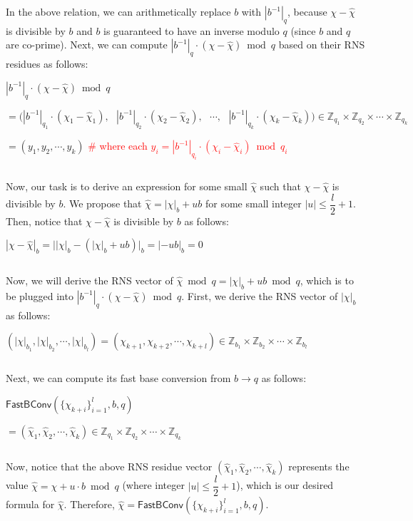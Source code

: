 $ $

In the above relation, we can arithmetically replace $b$ with $|b^{-1}|_q$, because $\chi - \hat{\chi}$ is divisible by $b$ and $b$ is guaranteed to have an inverse modulo $q$ (since $b$ and $q$ are co-prime). Next, we can compute  $|b^{-1}|_{q}\cdot (\chi - \hat{\chi}) \bmod q$ based on their RNS residues as follows:

$|b^{-1}|_q\cdot (\chi - \hat{\chi}) \bmod q$

$= \bm(|b^{-1}|_{q_1} \cdot (\chi_1 - \hat\chi_1), \text{ } |b^{-1}|_{q_2} \cdot (\chi_2 - \hat\chi_2), \text{ } \cdots, \text{ } |b^{-1}|_{q_k} \cdot (\chi_k - \hat\chi_k)\bm) \in \mathbb{Z}_{q_1} \times \mathbb{Z}_{q_2} \times \cdots \times \mathbb{Z}_{q_k} $

$= (y_1, y_2, \cdots, y_k) $ \textcolor{red}{ \# where each $y_i = |b^{-1}|_{q_i} \cdot (\chi_i - \hat\chi_i) \bmod q_i$}

$ $

Now, our task is to derive an expression for some small $\hat\chi$ such that $\chi - \hat\chi$ is divisible by $b$. We propose that $\hat\chi = |\chi|_b + ub$ for some small integer $|u| \leq \dfrac{l}{2}+1$. Then, notice that $\chi - \hat\chi$ is divisible by $b$ as follows:

$|\chi - \hat\chi|_b = \Big||\chi|_b - (|\chi|_b + ub)\Big|_b = |-ub|_b = 0$


$ $

Now, we will derive the RNS vector of $\hat\chi \bmod q = |\chi|_b + ub \bmod q$, which is to be plugged into $|b^{-1}|_q\cdot (\chi - \hat{\chi}) \bmod q$. First, we derive the RNS vector of $|\chi|_{b}$ as follows: 

$(|\chi|_{b_1}, |\chi|_{b_2}, \cdots, |\chi|_{b_l}) = (\chi_{k+1}, \chi_{k+2}, \cdots, \chi_{k+l}) \in \mathbb{Z}_{b_1} \times \mathbb{Z}_{b_2} \times \cdots \times \mathbb{Z}_{b_l}$



$ $

Next, we can compute its fast base conversion from $b \rightarrow q$ as follows:

$\textsf{FastBConv}(\{\chi_{k+i}\}_{i=1}^{l}, b, q)$

$= (\hat\chi_1, \hat\chi_2, \cdots, \hat\chi_{k}) \in \mathbb{Z}_{q_1} \times \mathbb{Z}_{q_2} \times \cdots \times \mathbb{Z}_{q_k}$

$ $ 

Now, notice that the above RNS residue vector $(\hat\chi_1, \hat\chi_2, \cdots, \hat\chi_k)$ represents the value $\hat\chi = \chi + u \cdot b \bmod q$ (where integer $|u| \leq \dfrac{l}{2}+1$), which is our desired formula for $\hat\chi$. Therefore, $\hat\chi = \textsf{FastBConv}(\{\chi_{k+i}\}_{i=1}^{l}, b, q)$.

